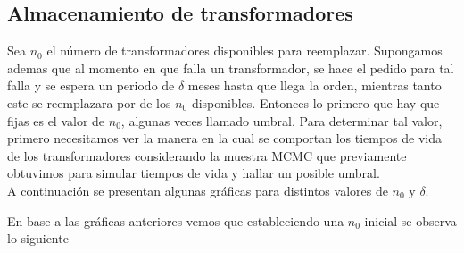\documentclass[letterpaper, titlepage,openright, twoside,11pt]{book}
\begin{document}
 

\subsection{Almacenamiento de transformadores}

Sea $n_0$ el n\'umero de transformadores disponibles para reemplazar. Supongamos ademas que al momento en que falla un transformador, se hace el pedido para tal falla y se espera un periodo de $\delta$ meses hasta que llega la orden, mientras tanto este se reemplazara por de los $n_0$ disponibles. Entonces lo primero que hay que fijas es el valor de $n_0$, algunas veces llamado umbral. Para determinar tal valor, primero necesitamos ver la manera en la cual se comportan los tiempos de vida de los transformadores considerando la muestra MCMC que previamente obtuvimos para simular tiempos de vida y hallar un posible umbral.\\[0.2cm]

A continuaci\'on se presentan algunas gr\'aficas para distintos valores de $n_0$ y $\delta$.

En base a las gr\'aficas anteriores vemos que estableciendo una $n_0$ inicial se observa lo siguiente
\end{document}
